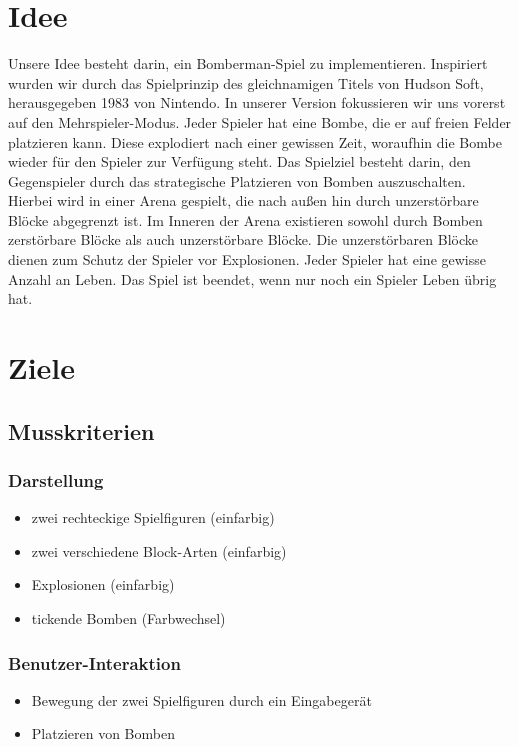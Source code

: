\documentclass[parskip=full]{scrartcl}
\begin{document}
	\section{Idee}
		Unsere Idee besteht darin, ein Bomberman-Spiel zu implementieren. Inspiriert wurden wir durch das Spielprinzip des gleichnamigen Titels von Hudson Soft, herausgegeben 1983 von Nintendo. In unserer Version fokussieren wir uns vorerst auf den Mehrspieler-Modus. 
		Jeder Spieler hat eine Bombe, die er auf freien Felder platzieren kann. Diese explodiert nach einer gewissen Zeit, woraufhin die Bombe wieder für den Spieler zur Verfügung steht.
		Das Spielziel besteht darin, den Gegenspieler durch das strategische Platzieren von Bomben auszuschalten. \newline
		Hierbei wird in einer Arena gespielt, die nach außen hin durch unzerstörbare Blöcke abgegrenzt ist. Im Inneren der Arena existieren sowohl durch Bomben zerstörbare Blöcke als auch unzerstörbare Blöcke. Die unzerstörbaren Blöcke dienen zum Schutz der Spieler vor Explosionen. \newline
		Jeder Spieler hat eine gewisse Anzahl an Leben. Das Spiel ist beendet, wenn nur noch ein Spieler Leben übrig hat.
	
	\section{Ziele}
		\subsection{Musskriterien}
			\subsubsection{Darstellung}
				\begin{itemize}[noitemsep]
					\item zwei rechteckige Spielfiguren (einfarbig)
					\item zwei verschiedene Block-Arten (einfarbig)
					\item Explosionen (einfarbig)
					\item tickende Bomben (Farbwechsel)
				\end{itemize}
				
			\subsubsection{Benutzer-Interaktion}
				\begin{itemize}[noitemsep]
					\item Bewegung der zwei Spielfiguren durch ein Eingabegerät
					\item Platzieren von Bomben
				\end{itemize}
				
\end{document}

